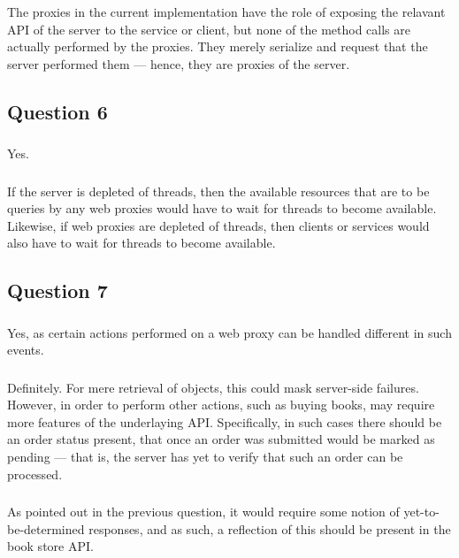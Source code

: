 \subsubsection{}
The proxies in the current implementation have the role of exposing the relavant
API of the server to the service or client, but none of the method calls are
actually performed by the proxies. They merely serialize and request that the
server performed them --- hence, they are proxies of the server.

\subsection{Question 6}

\subsubsection{}
Yes.

\subsubsection{}
If the server is depleted of threads, then the available resources that are to be
queries by any web proxies would have to wait for threads to become available.
Likewise, if web proxies are depleted of threads, then clients or services would
also have to wait for threads to become available.

\subsection{Question 7}

\subsubsection{}
Yes, as certain actions performed on a web proxy can be handled different in
such events.

\subsubsection{}
Definitely. For mere retrieval of objects, this could mask server-side
failures. However, in order to perform other actions, such as buying books,
may require more features of the underlaying API. Specifically, in such cases
there should be an order status present, that once an order was submitted would
be marked as pending --- that is, the server has yet to verify that such an
order can be processed.

\subsubsection{}
As pointed out in the previous question, it would require some notion of
yet-to-be-determined responses, and as such, a reflection of this should be
present in the book store API.


